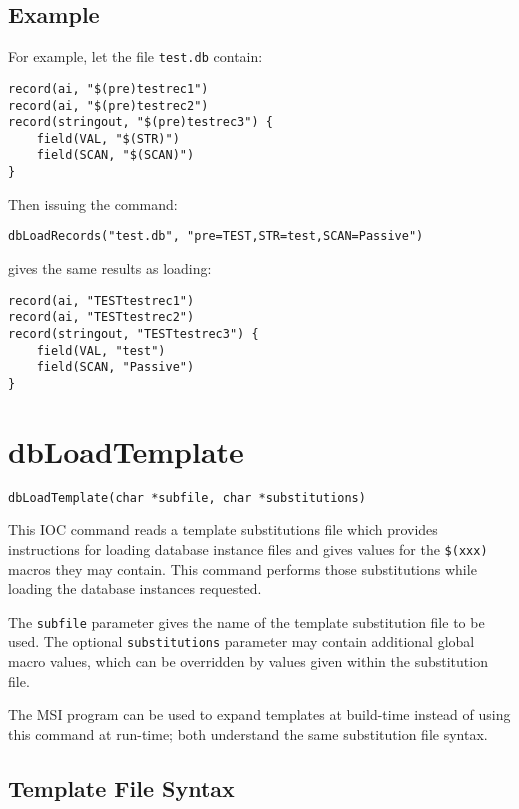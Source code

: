 \subsection{Example}

For example, let the file \verb|test.db| contain:

\begin{verbatim}
record(ai, "$(pre)testrec1")
record(ai, "$(pre)testrec2")
record(stringout, "$(pre)testrec3") {
    field(VAL, "$(STR)")
    field(SCAN, "$(SCAN)")
}
\end{verbatim}

Then issuing the command:

\begin{verbatim}
dbLoadRecords("test.db", "pre=TEST,STR=test,SCAN=Passive")
\end{verbatim}

gives the same results as loading:

\begin{verbatim}
record(ai, "TESTtestrec1")
record(ai, "TESTtestrec2")
record(stringout, "TESTtestrec3") {
    field(VAL, "test")
    field(SCAN, "Passive")
}
\end{verbatim}

\section{dbLoadTemplate}

\begin{verbatim}
dbLoadTemplate(char *subfile, char *substitutions)
\end{verbatim}

This IOC command reads a template substitutions file which provides instructions for loading database instance files and gives values for the \verb|$(xxx)| macros they may contain.
This command performs those substitutions while loading the database instances requested.

The \verb|subfile| parameter gives the name of the template substitution file to be used.
The optional \verb|substitutions| parameter may contain additional global macro values, which can be overridden by values given within the substitution file.

The MSI program can be used to expand templates at build-time instead of using this command at run-time; both understand the same substitution file syntax.

\subsection{Template File Syntax}


